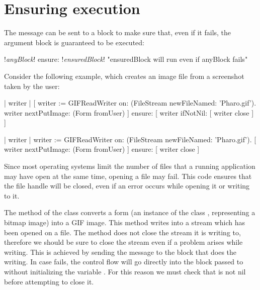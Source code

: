 \documentclass[a4paper,10pt,twoside]{book}
\begin{document}
\section{Ensuring execution}

The  message can be sent to a block to make sure that, even if it fails, the argument block is guaranteed to be executed:
\begin{code}{}
!\emph{anyBlock}! ensure: !\emph{ensuredBlock}!    "ensuredBlock will run even if anyBlock fails"
\end{code}

Consider the following example, which creates an image file from a screenshot taken by the user:

\begin{code}{}
| writer |
[	writer := GIFReadWriter on: (FileStream newFileNamed: 'Pharo.gif').
	writer nextPutImage: (Form fromUser)
]	ensure: [ writer ifNotNil: [ writer close ] ]
\end{code}


\begin{code}{}
| writer |
writer := GIFReadWriter on: (FileStream newFileNamed: 'Pharo.gif').
[ writer nextPutImage: (Form fromUser) ]
	ensure: [ writer close ]
\end{code}


Since most operating systems limit the number of files that a running application may have open at the same time, opening a file may fail.
This code ensures that the  file handle will be closed, even if an error occurs while opening it or writing to it.

The  method of the class  converts a form (\ie an instance of the class , representing a bitmap image) into a GIF image. This method writes into a stream which has been opened on a file. The  method does not close the stream it is writing to, therefore we should be sure to close the stream even if a problem arises while writing. This is achieved by sending the message  to the block that does the writing. In case  fails, the control flow will go directly into the block passed to  without initializing the variable . For this reason we must check that  is not nil before attempting to close it.
\end{document}

